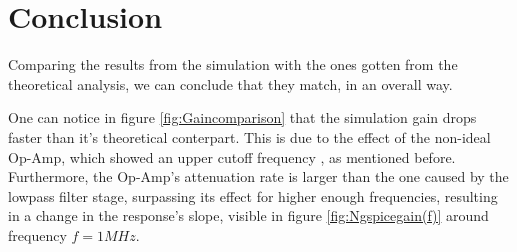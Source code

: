 \section{Conclusion}
\label{sec:conclusion}

\par Comparing the results from the simulation with the ones gotten from the theoretical analysis, we can conclude that they match, in an overall way.

\par One can notice in figure \ref{fig:Gaincomparison} that the simulation gain drops faster than it's theoretical conterpart. This is due to the effect of the non-ideal Op-Amp, which showed an upper cutoff frequency , as mentioned before. Furthermore, the Op-Amp's attenuation rate is larger than the one caused by the lowpass filter stage, surpassing its effect for higher enough frequencies, resulting in a change in the response's slope, visible in figure \ref{fig:Ngspicegain(f)} around frequency $f = 1 MHz$.




